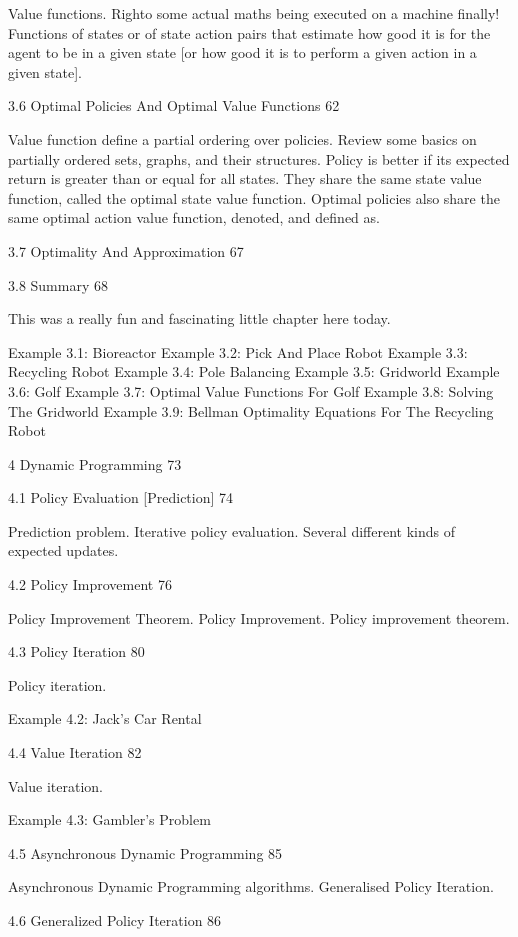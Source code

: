 Value functions. Righto some actual maths being executed on a machine finally! Functions of states or of state action pairs that estimate how good it is for the agent to be in a given state [or how good it is to perform a given action in a given state].

3.6 Optimal Policies And Optimal Value Functions 62

Value function define a partial ordering over policies. Review some basics on partially ordered sets, graphs, and their structures. Policy is better if its expected return is greater than or equal for all states. They share the same state value function, called the optimal state value function. Optimal policies also share the same optimal action value function, denoted, and defined as.

3.7 Optimality And Approximation 67



3.8 Summary 68

This was a really fun and fascinating little chapter here today.

Example 3.1: Bioreactor
Example 3.2: Pick And Place Robot
Example 3.3: Recycling Robot
Example 3.4: Pole Balancing
Example 3.5: Gridworld
Example 3.6: Golf
Example 3.7: Optimal Value Functions For Golf
Example 3.8: Solving The Gridworld
Example 3.9: Bellman Optimality Equations For The Recycling Robot

4 Dynamic Programming 73



4.1 Policy Evaluation [Prediction] 74

Prediction problem. Iterative policy evaluation. Several different kinds of expected updates.

4.2 Policy Improvement 76

Policy Improvement Theorem. Policy Improvement. Policy improvement theorem.

4.3 Policy Iteration 80

Policy iteration.

Example 4.2: Jack's Car Rental

4.4 Value Iteration 82

Value iteration.

Example 4.3: Gambler's Problem

4.5 Asynchronous Dynamic Programming 85

Asynchronous Dynamic Programming algorithms. Generalised Policy Iteration.

4.6 Generalized Policy Iteration 86

